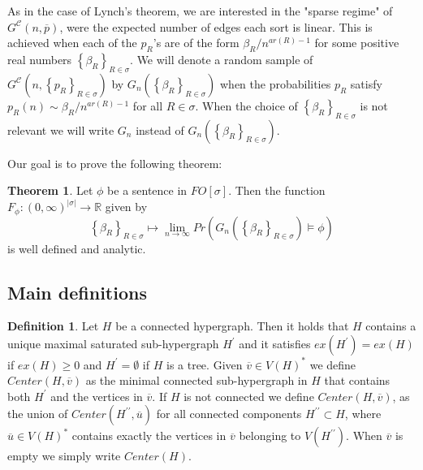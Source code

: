 \documentclass[12pt,notitlepage,a4paper]{article}
\theoremstyle{definition}
\newtheorem{theorem}{Theorem}[section]
\newtheorem{definition}{Definition}[section]
\newcommand{\R}{\mathbb{R}}
\newcommand{\Ln}{\lim\limits_{n\to \infty}}
\newcommand{\InR}[1]{\left\{ #1_R \right\}_{R\in \sigma}}
\begin{document}
As in the case of Lynch's theorem, we are interested in the
"sparse regime" of $G^\mathcal{C}(n,\overline{p})$, were the 
expected number of edges each sort is linear. 
This is achieved when each of the $p_R$'s are 
of the form $\beta_R/n^{ar(R)-1}$ for some 
positive real numbers $\InR{\beta}$.
We will denote a random sample of 
$G^\mathcal{C}\left(n,\left\{p_R\right\}_{R\in\sigma}\right)$
by $G_n\left(\InR{\beta}\right)$ when the probabilities $p_R$
satisfy $p_R(n)\sim \beta_R/n^{ar(R)-1}$ for all $R\in \sigma$.
When the choice of $\InR{\beta}$ is not relevant
we will write $G_n$ instead of 
$G_n\left(\InR{\beta}\right)$.\par

Our goal is to prove the following theorem:


\begin{theorem} \label{thm:main}
	Let $\phi$ be a sentence in $FO[\sigma]$. Then
	the function
	$F_\phi: (0,\infty)^{|\sigma|}
	\rightarrow \R$ given by 
	\[
	\InR{\beta} \mapsto \Ln Pr\left( G_n\left(
	\InR{\beta}\right) \models \phi\right)
	\]
	is well defined and analytic. 
\end{theorem}

\subsection{Main definitions}

\begin{definition} 
Let $H$ be a connected hypergraph. Then it holds that
$H$ contains a unique maximal saturated sub-hypergraph $H^\prime$
and it satisfies $ex(H^\prime)=ex(H)$ if $ex(H)\geq 0$ and $H^\prime=\emptyset$ 
if $H$ is a tree. Given
$\overline{v}\in V(H)^*$ we define $Center(H,\overline{v})$ as the 
minimal connected sub-hypergraph in $H$ that contains both $H^\prime$
and the vertices in $\overline{v}$. 
If $H$ is not connected 
we define $Center(H,\overline{v})$,
as the union of $Center(H^{\prime\prime},\overline{u})$
for all connected components $H^{\prime\prime} \subset H$,
where $\overline{u}\in V(H)^*$ contains exactly the vertices
in $\overline{v}$ belonging to $V(H^{\prime\prime})$. When $\overline{v}$
is empty we simply write $Center(H)$.
\end{definition}
\end{document}
